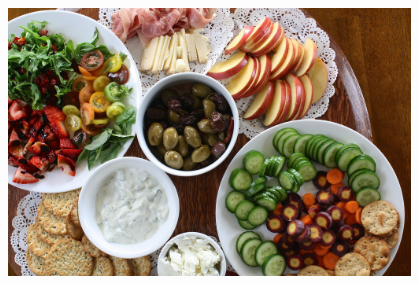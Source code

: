 \begin{myquote}





\begin{figure}[H]
\centering
\includegraphics[width=0.95\textwidth]{./imgSAEB_7_POR/media/image69.png}
\end{figure} 


\end{myquote}
